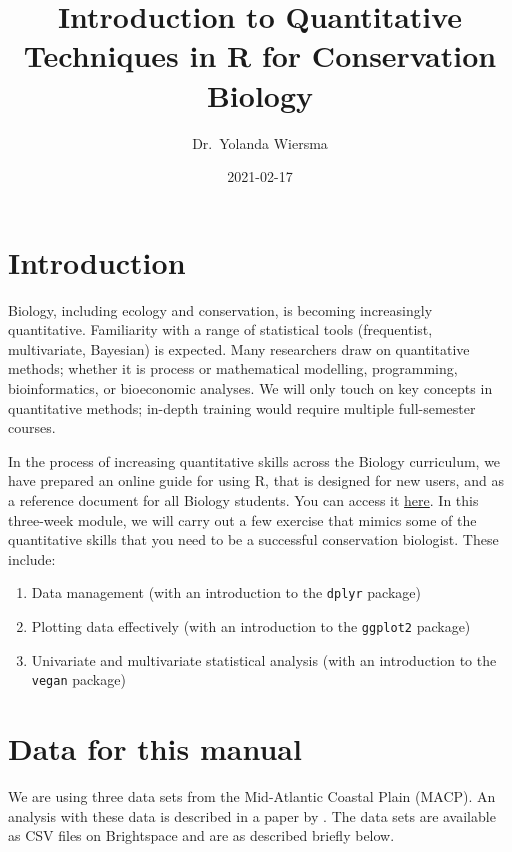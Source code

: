 \documentclass[
]{book}
\title{Introduction to Quantitative Techniques in R for Conservation Biology}
\author{Dr.~Yolanda Wiersma}
\date{2021-02-17}
\providecommand{\tightlist}{%
  \setlength{\itemsep}{0pt}\setlength{\parskip}{0pt}}
\begin{document}
\maketitle

{
\setcounter{tocdepth}{1}
\tableofcontents
}
\hypertarget{introduction}{%
\chapter{Introduction}\label{introduction}}

Biology, including ecology and conservation, is becoming increasingly quantitative. Familiarity with a range of statistical tools (frequentist, multivariate, Bayesian) is expected. Many researchers draw on quantitative methods; whether it is process or mathematical modelling, programming, bioinformatics, or bioeconomic analyses. We will only touch on key concepts in quantitative methods; in-depth training would require multiple full-semester courses.

In the process of increasing quantitative skills across the Biology curriculum, we have prepared an online guide for using R, that is designed for new users, and as a reference document for all Biology students. You can access it \href{https://ahurford.github.io/quant-guide-all-courses/}{here}.
In this three-week module, we will carry out a few exercise that mimics some of the quantitative skills that you need to be a successful conservation biologist. These include:

\begin{enumerate}
\def\labelenumi{\arabic{enumi}.}
\tightlist
\item
  Data management (with an introduction to the \texttt{dplyr} package)
\item
  Plotting data effectively (with an introduction to the \texttt{ggplot2} package)
\item
  Univariate and multivariate statistical analysis (with an introduction to the \texttt{vegan} package)
\end{enumerate}

\hypertarget{data}{%
\chapter{Data for this manual}\label{data}}

We are using three data sets from the Mid-Atlantic Coastal Plain (MACP). An analysis with these data is described in a paper by \citet{McMullin2019}. The data sets are available as CSV files on Brightspace and are as described briefly below.
\end{document}
